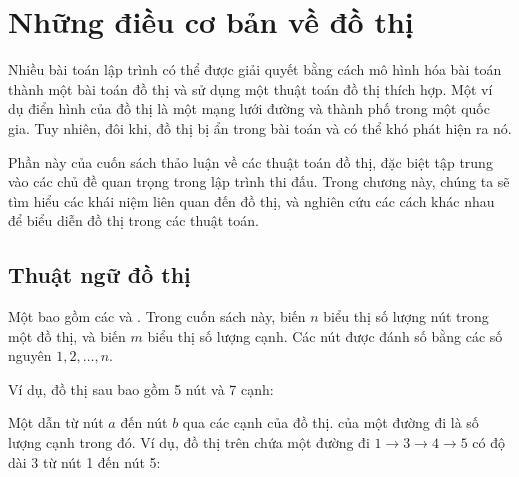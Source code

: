 \chapter{Những điều cơ bản về đồ thị}

Nhiều bài toán lập trình có thể được giải quyết bằng cách
mô hình hóa bài toán thành một bài toán đồ thị
và sử dụng một thuật toán đồ thị thích hợp.
Một ví dụ điển hình của đồ thị là một mạng lưới
đường và thành phố trong một quốc gia.
Tuy nhiên, đôi khi, đồ thị bị ẩn
trong bài toán và có thể khó phát hiện ra nó.

Phần này của cuốn sách thảo luận về các thuật toán đồ thị,
đặc biệt tập trung vào các chủ đề
quan trọng trong lập trình thi đấu.
Trong chương này, chúng ta sẽ tìm hiểu các khái niệm
liên quan đến đồ thị,
và nghiên cứu các cách khác nhau để biểu diễn đồ thị trong các thuật toán.

\section{Thuật ngữ đồ thị}


Một  bao gồm các 
và . Trong cuốn sách này,
biến $n$ biểu thị số lượng nút
trong một đồ thị, và biến $m$ biểu thị
số lượng cạnh.
Các nút được đánh số
bằng các số nguyên $1,2,\ldots,n$.

Ví dụ, đồ thị sau bao gồm 5 nút và 7 cạnh:

\begin{center}
\end{center}


Một  dẫn từ nút $a$ đến nút $b$
qua các cạnh của đồ thị.
 của một đường đi là số lượng
cạnh trong đó.
Ví dụ, đồ thị trên chứa
một đường đi $1 \rightarrow 3 \rightarrow 4 \rightarrow 5$
có độ dài 3
từ nút 1 đến nút 5:

